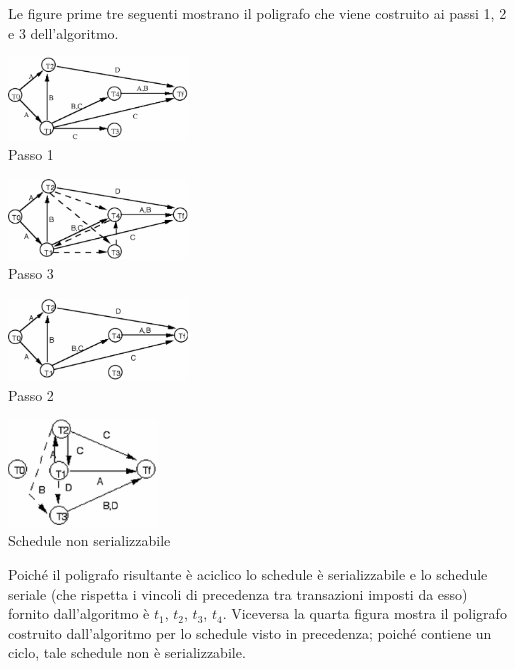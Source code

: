 Le figure prime tre seguenti mostrano il poligrafo che viene costruito ai passi 1, 2 e 3 dell'algoritmo.
\begin{multicols}{2}

\includegraphics[width=180px]{img_6_3_2(1).eps}\\
Passo 1

\includegraphics[width=180px]{img_6_3_2(3).eps}\\
Passo 3

\includegraphics[width=180px]{img_6_3_2(2).eps}\\
Passo 2

\includegraphics[width=150px]{img_6_3_2(4).eps}\\
Schedule non serializzabile
\end{multicols}

Poiché il poligrafo risultante è aciclico lo schedule è serializzabile e lo schedule seriale (che rispetta
i vincoli di precedenza tra transazioni imposti da esso) fornito dall'algoritmo è $t_1$, $t_2$, $t_3$, $t_4$. Viceversa la
quarta figura mostra il poligrafo costruito dall'algoritmo per lo schedule visto in
precedenza; poiché contiene un ciclo, tale schedule non è serializzabile.



